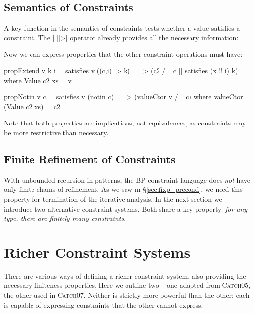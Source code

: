 \documentclass[preprint]{sigplanconf}
\newcommand{\catch}{\textsc{Catch}}
\newcommand{\newtool}{\catch07}
\newcommand{\oldtool}{\catch05}
\begin{document}
\subsection{Semantics of Constraints}

A key function in the semantics of constraints tests whether a value satisfies a constraint. The | ||>| operator already provides all the necessary information:

\noindent\begin{minipage}{\linewidth}
\end{minipage}

Now we can express properties that the other constraint operations must have:

\begin{code}
propExtend v k i =  satisfies v ((c,i) |> k)
                    ==> (c2 /= c || satisfies (x !! i) k)
    where Value c2 xs = v

propNotin v c = satisfies v (notin c) ==> (valueCtor v /= c)
    where valueCtor (Value c2 xs) = c2
\end{code}

\noindent Note that both properties are implications, not equivalences, as constraints may be more restrictive than necessary.

\subsection{Finite Refinement of Constraints}
\label{sec:bounded}

With unbounded recursion in patterns, the BP-constraint language does \textit{not} have only finite chains of refinement. As we saw in \S\ref{sec:fixp_precond}, we need this property for termination of the iterative analysis. In the next section we introduce two alternative constraint systems. Both share a key property: \textit{for any type, there are finitely many constraints}.


\section{Richer Constraint Systems}
\label{sec:constraint}

There are various ways of defining a richer constraint system, also providing the necessary finiteness properties. Here we outline two -- one adapted from \oldtool{}, the other used in \newtool{}. Neither is strictly more powerful than the other; each is capable of expressing constraints that the other cannot express.
\end{document}
